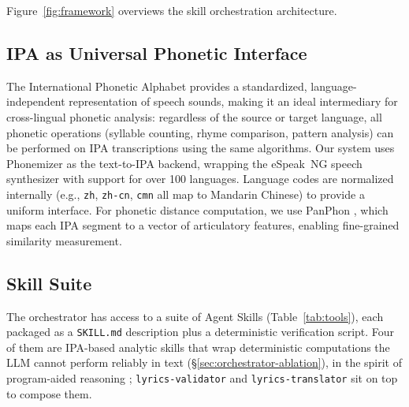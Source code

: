 \documentclass[11pt]{article}
\begin{document}
Figure~\ref{fig:framework} overviews the skill orchestration architecture.

\subsection{IPA as Universal Phonetic Interface}

The International Phonetic Alphabet provides a standardized, language-independent representation of speech sounds, making it an ideal intermediary for cross-lingual phonetic analysis: regardless of the source or target language, all phonetic operations (syllable counting, rhyme comparison, pattern analysis) can be performed on IPA transcriptions using the same algorithms.
Our system uses Phonemizer \citep{bernard-titeux-2021-phonemizer} as the text-to-IPA backend, wrapping the eSpeak~NG speech synthesizer with support for over 100 languages.
Language codes are normalized internally (e.g., \texttt{zh}, \texttt{zh-cn}, \texttt{cmn} all map to Mandarin Chinese) to provide a uniform interface.
For phonetic distance computation, we use PanPhon \citep{mortensen-etal-2016-panphon}, which maps each IPA segment to a vector of articulatory features, enabling fine-grained similarity measurement.

\subsection{Skill Suite}
\label{sec:tools}

The orchestrator has access to a suite of Agent Skills (Table~\ref{tab:tools}), each packaged as a \texttt{SKILL.md} description plus a deterministic verification script.
Four of them are IPA-based analytic skills that wrap deterministic computations the LLM cannot perform reliably in text (\S\ref{sec:orchestrator-ablation}), in the spirit of program-aided reasoning \citep{gao-etal-2023-pal}; \texttt{lyrics-validator} and \texttt{lyrics-translator} sit on top to compose them.
\end{document}
